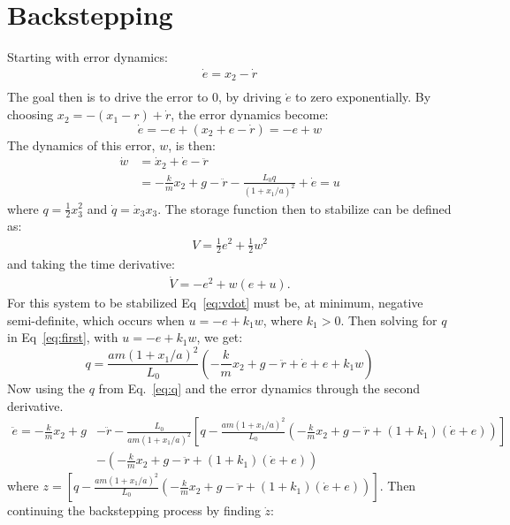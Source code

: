 \documentclass{article}
\begin{document}
\section{Backstepping}
Starting with error dynamics:
\begin{align}
    \dot{e} = x_2 - \dot{r} \\
\end{align}
The goal then is to drive the error to 0, by driving $\dot{e}$ to zero exponentially. By choosing $x_2 = -(x_1 - r) + \dot{r}$, the error dynamics become:
\begin{equation}
    \dot{e} = -e + (x_2 + e - \dot{r}) = -e + w
\end{equation}
The dynamics of this error, $w$, is then:
\begin{align}
    \dot{w} &= \dot{x}_2 + \dot{e} - \ddot{r} \\
    &= -\frac{k}{m}x_2 + g - \ddot{r} - \frac{L_0q}{(1 + x_1/a)^2} + \dot{e} = u \label{eq:first}
\end{align}
where $q = \frac{1}{2}x_3^2$ and $\dot{q} = \dot{x}_3x_3$. The storage function then to stabilize can be defined as:
\begin{align}
    V = \frac{1}{2}e^2 + \frac{1}{2}w^2
\end{align}
and taking the time derivative:
\begin{align}
    \dot{V} = -e^2 + w(e + u). \label{eq:vdot}
\end{align}
For this system to be stabilized Eq~\ref{eq:vdot} must be, at minimum, negative semi-definite, which occurs when $u = -e + k_1w$, where $k_1 > 0$. Then solving for $q$ in Eq~\ref{eq:first}, with $u = -e + k_1w$, we get:
\begin{equation}
    q = \frac{am(1 + x_1/a)^2}{L_0}\left(-\frac{k}{m}x_2 + g - \ddot{r} + \dot{e} + e + k_1w\right) \label{eq:q}
\end{equation}
Now using the $q$ from Eq.~\ref{eq:q} and the error dynamics through the second derivative.
\begin{align*}
    \ddot{e} = -\frac{k}{m}x_2 + g &- \ddot{r} - \frac{L_0}{am(1 + x_1/a)^2}\left[q - \frac{am(1 + x_1/a)^2}{L_0}\left(-\frac{k}{m}x_2 + g - \ddot{r} + (1 + k_1)(\dot{e} + e)\right)\right] \\
    &- \left(-\frac{k}{m}x_2 + g - \ddot{r} + (1 + k_1)(\dot{e} + e)\right)
\end{align*}
where $z = \left[q - \frac{am(1 + x_1/a)^2}{L_0}\left(-\frac{k}{m}x_2 + g - \ddot{r} + (1 + k_1)(\dot{e} + e)\right)\right] $. Then continuing the backstepping process by finding $\dot{z}$:
\end{document}
